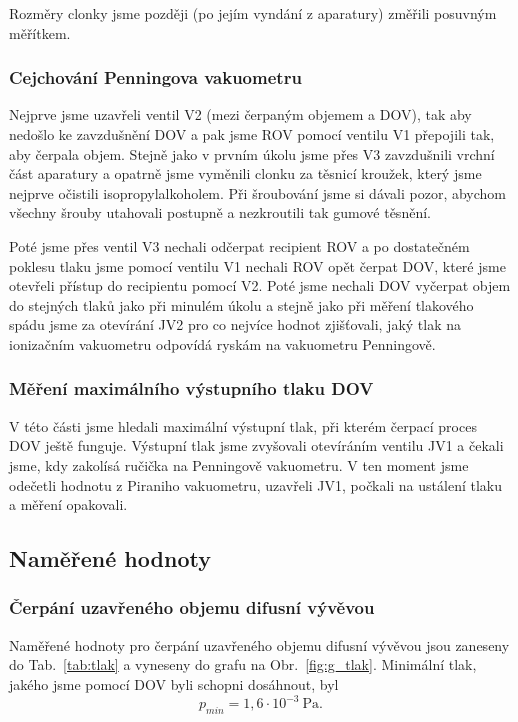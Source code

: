 \documentclass[english]{article}
\newcommand{\unit}[1]{~\mathrm{#1}}
\begin{document}
		Rozměry clonky jsme později (po jejím vyndání z aparatury) změřili posuvným měřítkem.
	
	\subsubsection{Cejchování Penningova vakuometru}
		Nejprve jsme uzavřeli ventil V2 (mezi čerpaným objemem a DOV), tak aby nedošlo ke zavzdušnění DOV a pak jsme ROV pomocí ventilu V1 přepojili tak, aby čerpala objem. Stejně jako v prvním úkolu jsme přes V3 zavzdušnili vrchní část aparatury a opatrně jsme vyměnili clonku za těsnicí kroužek, který jsme nejprve očistili isopropylalkoholem. Při šroubování jsme si dávali pozor, abychom všechny šrouby utahovali postupně a nezkroutili tak gumové těsnění.  
		
		Poté jsme přes ventil V3 nechali odčerpat recipient ROV a po dostatečném poklesu tlaku jsme pomocí ventilu V1 nechali ROV opět čerpat DOV, které jsme otevřeli přístup do recipientu pomocí V2. Poté jsme nechali DOV vyčerpat objem do stejných tlaků jako při minulém úkolu a stejně jako při měření tlakového spádu jsme za otevírání JV2 pro co nejvíce hodnot zjišťovali, jaký tlak na ionizačním vakuometru odpovídá ryskám na vakuometru Penningově. 
	
	\subsubsection{Měření maximálního výstupního tlaku DOV}
		V této části jsme hledali maximální výstupní tlak, při kterém čerpací proces DOV ještě funguje. Výstupní tlak jsme zvyšovali otevíráním ventilu JV1 a čekali jsme, kdy zakolísá ručička na Penningově vakuometru. V ten moment jsme odečetli hodnotu z Piraniho vakuometru, uzavřeli JV1, počkali na ustálení tlaku a měření opakovali.

\subsection{Naměřené hodnoty}

	\subsubsection{Čerpání uzavřeného objemu difusní vývěvou}
		Naměřené hodnoty pro čerpání uzavřeného objemu difusní vývěvou jsou zaneseny do Tab.~\ref{tab:tlak} a vyneseny do grafu na Obr.~\ref{fig:g_tlak}. Minimální tlak, jakého jsme pomocí DOV byli schopni dosáhnout, byl 
		\begin{equation}
			p_{min} = 1,6\cdot10^{-3}\unit{Pa}.
		\label{eq:pmin}
		\end{equation}
	
\end{document}
